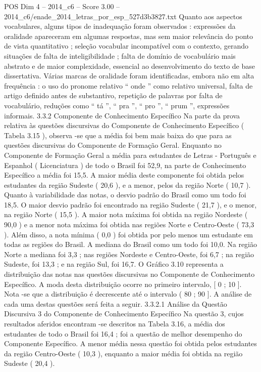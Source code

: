\begin{textsample}{POS Dim 4 – 2014\_c6 – Score 3.00 – 2014\_c6/enade\_2014\_letras\_por\_esp\_527d3b3827.txt}
Quanto aos aspectos vocabulares, alguns tipos de inadequação foram observados : expressões da oralidade apareceram em algumas respostas, mas sem maior relevância do ponto de vista quantitativo ; seleção vocabular incompatível com o contexto, gerando situações de falta de inteligibilidade ; falta de domínio de vocabulário mais abstrato e de maior complexidade, essencial ao desenvolvimento do texto de base dissertativa.
Várias marcas de oralidade foram identificadas, embora não em alta frequência : o uso do pronome relativo “ onde ” como relativo universal, falta de artigo definido antes de substantivo, repetição de palavras por falta de vocabulário, reduções como “ tá ”, “ pra ”, “ pro ”, “ prum ”, expressões informais. 3.3.2 Componente de Conhecimento Específico Na parte da prova relativa às questões discursivas do Componente de Conhecimento Específico ( Tabela 3.15 ), observa -se que a média foi bem mais baixa do que para as questões discursivas do Componente de Formação Geral.
Enquanto no Componente de Formação Geral a média para estudantes de Letras - Português e Espanhol ( Licenciatura ) de todo o Brasil foi 52,9, na parte de Conhecimento Específico a média foi 15,5.
A maior média deste componente foi obtida pelos estudantes da região Sudeste ( 20,6 ), e a menor, pelos da região Norte ( 10,7 ).
Quanto à variabilidade das notas, o desvio padrão do Brasil como um todo foi 18,5.
O maior desvio padrão foi encontrado na região Sudeste ( 21,7 ), e o menor, na região Norte ( 15,5 ).
A maior nota máxima foi obtida na região Nordeste ( 90,0 ) e a menor nota máxima foi obtida nas regiões Norte e Centro-Oeste ( 73,3 ).
Além disso, a nota mínima ( 0,0 ) foi obtida por pelo menos um estudante em todas as regiões do Brasil.
A mediana do Brasil como um todo foi 10,0.
Na região Norte a mediana foi 3,3 ; nas regiões Nordeste e Centro-Oeste, foi 6,7 ; na região Sudeste, foi 13,3 ; e na região Sul, foi 16,7.
O Gráfico 3.10 representa a distribuição das notas nas questões discursivas no Componente de Conhecimento Específico.
A moda desta distribuição ocorre no primeiro intervalo, [ 0 ; 10 ].
Nota -se que a distribuição é decrescente até o intervalo ( 80 ; 90 ].
A análise de cada uma destas questões será feita a seguir. 3.3.2.1 Análise da Questão Discursiva 3 do Componente de Conhecimento Específico Na questão 3, cujos resultados aferidos encontram -se descritos na Tabela 3.16, a média dos estudantes de todo o Brasil foi 16,4 ; foi a questão de melhor desempenho do Componente Específico.
A menor média nessa questão foi obtida pelos estudantes da região Centro-Oeste ( 10,3 ), enquanto a maior média foi obtida na região Sudeste ( 20,4 ).

\end{textsample}
